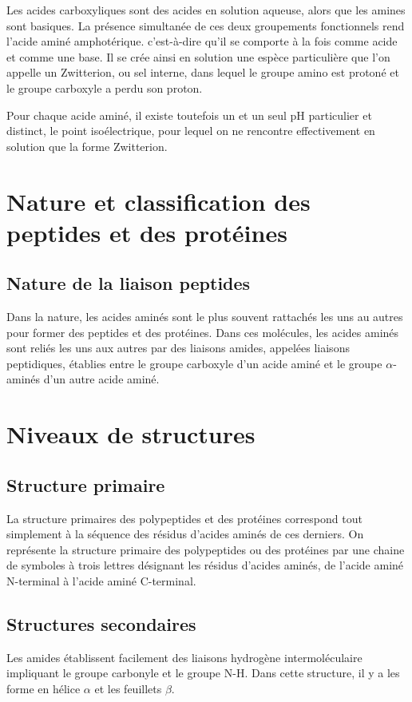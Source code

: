 Les acides carboxyliques sont des acides en solution aqueuse, alors que les amines sont basiques.
La présence simultanée de ces deux groupements fonctionnels rend l'acide aminé amphotérique.
c'est-à-dire qu'il
se comporte à la fois comme acide et comme une base.
Il se crée ainsi en solution une espèce particulière que l'on appelle un Zwitterion, ou sel interne, dans lequel le groupe amino est protoné et le groupe carboxyle a perdu son proton.

Pour chaque acide aminé, il existe toutefois un et un seul pH particulier et distinct, le point isoélectrique, pour lequel on ne rencontre effectivement en solution que la forme Zwitterion.


\section{Nature et classification des peptides et des protéines}
\subsection{Nature de la liaison peptides}
Dans la nature, les acides aminés sont le plus souvent rattachés les uns au autres pour former des peptides et des protéines.
Dans ces molécules, les acides aminés sont reliés les uns aux autres par des liaisons amides, appelées liaisons peptidiques, établies entre le groupe carboxyle d'un acide aminé et le groupe $\alpha$-aminés d'un autre acide aminé.

\section{Niveaux de structures}
\subsection{Structure primaire}
La structure primaires des polypeptides et des protéines correspond tout simplement à la séquence des résidus d'acides aminés de ces derniers.
On représente la structure primaire des polypeptides ou des protéines par une chaine de symboles à trois lettres désignant les résidus d'acides aminés, de l'acide aminé N-terminal à l'acide aminé C-terminal.


\subsection{Structures secondaires}
Les amides établissent facilement des liaisons hydrogène intermoléculaire impliquant le groupe carbonyle et le groupe N-H.
Dans cette structure,  il y a les forme en hélice $\alpha$ et les feuillets $\beta$.

